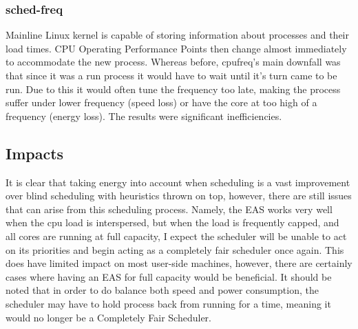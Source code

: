 \subsubsection{sched-freq}
Mainline Linux kernel is capable of storing information about processes and their load times. CPU Operating Performance Points then change almost immediately to accommodate the new process. Whereas before, cpufreq's main downfall was that since it was a run process it would have to wait until it's turn came to be run. Due to this it would often tune the frequency too late, making the process suffer under lower frequency (speed loss) or have the core at too high of a frequency (energy loss). The results were significant inefficiencies.\cite{EASp2015}

\subsection{Impacts}
It is clear that taking energy into account when scheduling is a vast improvement over blind scheduling with heuristics thrown on top, however, there are still issues that can arise from this scheduling process. Namely, the EAS works very well when the cpu load is interspersed, but when the load is frequently capped, and all cores are running at full capacity, I expect the scheduler will be unable to act on its priorities and begin acting as a completely fair scheduler once again. This does have limited impact on most user-side machines, however, there are certainly cases where having an EAS for full capacity would be beneficial. It should be noted that in order to do balance both speed and power consumption, the scheduler may have to hold process back from running for a time, meaning it would no longer be a Completely Fair Scheduler.